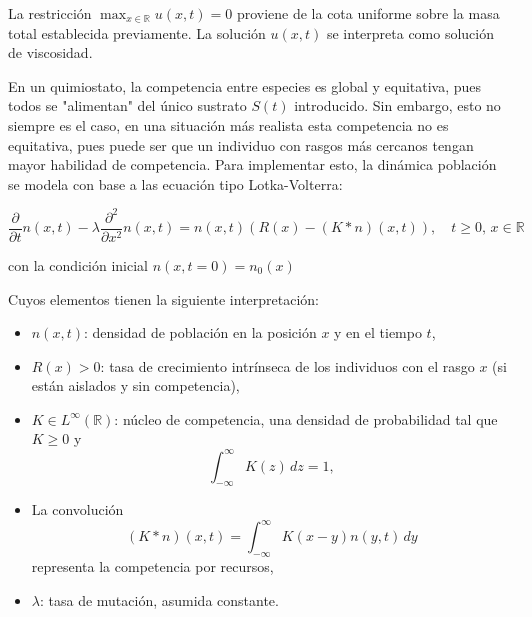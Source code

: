 La restricción \( \max_{x \in \mathbb{R}} u(x, t) = 0 \) proviene de la cota uniforme sobre la masa total establecida previamente. La solución \( u(x,t) \) se interpreta como solución de viscosidad.

\citep{Mirrahimi2011}En un quimiostato, la competencia entre especies es global y equitativa, pues todos se "alimentan" del único sustrato $S(t)$ introducido. Sin embargo, esto no siempre es el caso, en una situación más realista esta competencia no es equitativa, pues puede ser que un individuo con rasgos más cercanos tengan mayor habilidad de competencia. Para implementar esto, la dinámica población se modela con base a las ecuación tipo Lotka-Volterra:

\begin{equation*}
	\frac{\partial}{\partial t} n(x,t) - \lambda \frac{\partial^2}{\partial x^2} n(x,t) = n(x,t) \left( R(x) - (K * n)(x,t) \right), \quad t \geq 0, \, x \in \mathbb{R}
\end{equation*}

con la condición inicial $n(x,t=0)=n_0(x)$

Cuyos elementos tienen la siguiente interpretación:

\begin{itemize}
	\item \( n(x,t) \): densidad de población en la posición \( x \) y en el tiempo \( t \),
	\item \( R(x) > 0 \): tasa de crecimiento intrínseca de los individuos con el rasgo \( x \) (si están aislados y sin competencia),
	\item \( K \in L^\infty(\mathbb{R}) \): núcleo de competencia, una densidad de probabilidad tal que \( K \geq 0 \) y
	      \[
		      \int_{-\infty}^{\infty} K(z) \, dz = 1,
	      \]
	\item La convolución
	      \[
		      (K * n)(x,t) = \int_{-\infty}^{\infty} K(x - y) n(y,t) \, dy
	      \]
	      representa la competencia por recursos,
	\item \( \lambda \): tasa de mutación, asumida constante.
\end{itemize}
